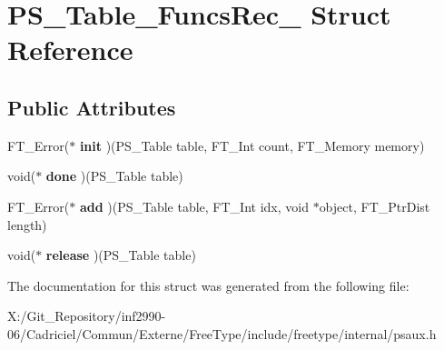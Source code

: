 \hypertarget{struct_p_s___table___funcs_rec__}{\section{P\-S\-\_\-\-Table\-\_\-\-Funcs\-Rec\-\_\- Struct Reference}
\label{struct_p_s___table___funcs_rec__}
}
\subsection*{Public Attributes}
\begin{DoxyCompactItemize}
\item 
\hypertarget{struct_p_s___table___funcs_rec___ad0e795ae1e8a7040b7ef80d4a46e8d6a}{F\-T\-\_\-\-Error($\ast$ {\bfseries init} )(P\-S\-\_\-\-Table table, F\-T\-\_\-\-Int count, F\-T\-\_\-\-Memory memory)}\label{struct_p_s___table___funcs_rec___ad0e795ae1e8a7040b7ef80d4a46e8d6a}

\item 
\hypertarget{struct_p_s___table___funcs_rec___a33d660e1444fbe0ef35a87645f5831ad}{void($\ast$ {\bfseries done} )(P\-S\-\_\-\-Table table)}\label{struct_p_s___table___funcs_rec___a33d660e1444fbe0ef35a87645f5831ad}

\item 
\hypertarget{struct_p_s___table___funcs_rec___a38a0e111e48a877f52cce490362e4c91}{F\-T\-\_\-\-Error($\ast$ {\bfseries add} )(P\-S\-\_\-\-Table table, F\-T\-\_\-\-Int idx, void $\ast$object, F\-T\-\_\-\-Ptr\-Dist length)}\label{struct_p_s___table___funcs_rec___a38a0e111e48a877f52cce490362e4c91}

\item 
\hypertarget{struct_p_s___table___funcs_rec___a252959418225279f78e2ece7fc7705bd}{void($\ast$ {\bfseries release} )(P\-S\-\_\-\-Table table)}\label{struct_p_s___table___funcs_rec___a252959418225279f78e2ece7fc7705bd}

\end{DoxyCompactItemize}


The documentation for this struct was generated from the following file\-:\begin{DoxyCompactItemize}
\item 
X\-:/\-Git\-\_\-\-Repository/inf2990-\/06/\-Cadriciel/\-Commun/\-Externe/\-Free\-Type/include/freetype/internal/psaux.\-h\end{DoxyCompactItemize}
